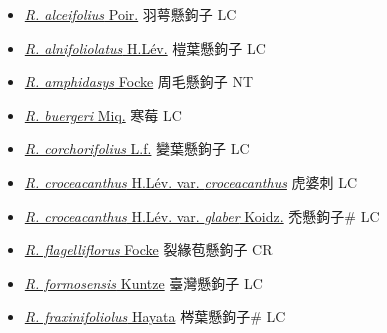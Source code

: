 \begin{itemize}
  \begin{itemize}
        \item[] \href{http://www.theplantlist.org/tpl1.1/search?q=Rubus+alceifolius}{\textit{R. alceifolius} Poir.}   羽萼懸鉤子 LC
        \item[] \href{http://www.theplantlist.org/tpl1.1/search?q=Rubus+alnifoliolatus}{\textit{R. alnifoliolatus} H.Lév.}   榿葉懸鉤子 LC
        \item[] \href{http://www.theplantlist.org/tpl1.1/search?q=Rubus+amphidasys}{\textit{R. amphidasys} Focke}   周毛懸鉤子 NT
        \item[] \href{http://www.theplantlist.org/tpl1.1/search?q=Rubus+buergeri}{\textit{R. buergeri} Miq.}   寒莓 LC
        \item[] \href{http://www.theplantlist.org/tpl1.1/search?q=Rubus+corchorifolius}{\textit{R. corchorifolius} L.f.}   變葉懸鉤子 LC
        \item[] \href{http://www.theplantlist.org/tpl1.1/search?q=Rubus+croceacanthus+var.+croceacanthus}{\textit{R. croceacanthus} H.Lév. var. \textit{croceacanthus}}   虎婆刺 LC
        \item[] \href{http://www.theplantlist.org/tpl1.1/search?q=Rubus+croceacanthus+var.+glaber}{\textit{R. croceacanthus} H.Lév. var. \textit{glaber} Koidz.}   禿懸鉤子\# LC
        \item[] \href{http://www.theplantlist.org/tpl1.1/search?q=Rubus+flagelliflorus}{\textit{R. flagelliflorus} Focke}   裂緣苞懸鉤子 CR
        \item[] \href{http://www.theplantlist.org/tpl1.1/search?q=Rubus+formosensis}{\textit{R. formosensis} Kuntze}   臺灣懸鉤子 LC
        \item[] \href{http://www.theplantlist.org/tpl1.1/search?q=Rubus+fraxinifoliolus}{\textit{R. fraxinifoliolus} Hayata}   梣葉懸鉤子\# LC

\end{itemize}
\end{itemize}
